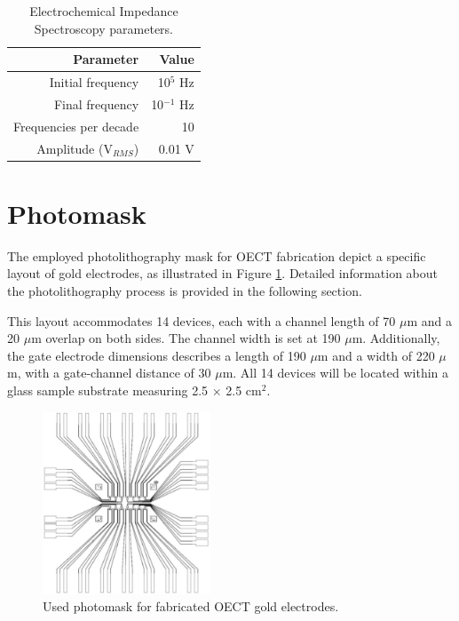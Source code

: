 \begin{itemize}
\begin{table}[h]
	\centering
	\caption{Electrochemical Impedance Spectroscopy parameters.}
	\begin{tabular}{r r} \hline
		Parameter	& Value \\ \hline
		Initial frequency	& 10$^{5}$ Hz  \\ 
		Final frequency	& 10$^{-1}$ Hz \\ 
		Frequencies per decade	& 10 \\ 
		Amplitude (V$_{RMS}$)	& 0.01 V \\ \hline
	\end{tabular}
	\label{tab:EIS}
\end{table}


\end{itemize}

\section{Photomask}
The employed photolithography mask for OECT fabrication depict a specific layout of gold electrodes, as illustrated in Figure \ref{fig:mask}. Detailed information about the photolithography process is provided in the following section. 

This layout accommodates 14 devices, each with a channel length of 70 $\mu$m and a 20 $\mu$m overlap on both sides. The channel width is set at 190 $\mu$m. Additionally, the gate electrode dimensions describes a length of 190 $\mu$m and a width of 220 $\mu$m, with a gate-channel distance of 30 $\mu$m. All 14 devices will be located within a glass sample substrate measuring 2.5 $\times$ 2.5 cm$^{2}$.

\begin{figure}[ht]
  \centering
  \includegraphics[width=5cm]{Images/pdf/photomask.pdf}
  \caption{Used photomask for fabricated OECT gold electrodes.}
  \label{fig:mask}
\end{figure}

